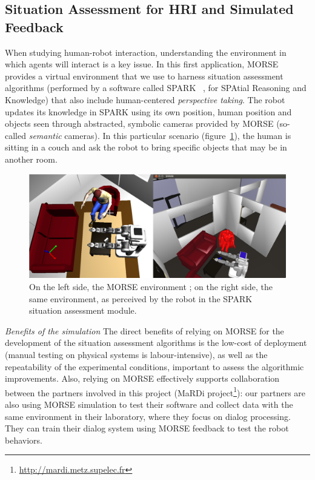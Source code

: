 \documentclass{llncs}
\begin{document}
\subsection{Situation Assessment for HRI and Simulated Feedback}
\label{sc:assessment}

When studying human-robot interaction, understanding the environment in which
agents will interact is a key issue. In this first application, MORSE provides a
virtual environment that we use to harness situation assessment algorithms
(performed by a software called SPARK ~\cite{Warnier2012a}, for SPAtial
Reasoning and Knowledge) that also include human-centered \emph{perspective
taking}. The robot updates its knowledge in SPARK using its own position, human
position and objects seen through abstracted, symbolic cameras provided by MORSE
(so-called \emph{semantic} cameras). In this particular scenario
(figure~\ref{fig|spark}), the human is sitting in a couch and ask the robot to
bring specific objects that may be in another room.

\begin{figure}[t]
      \centering
      \includegraphics[width=0.7\linewidth]{morsespark.png}
      \caption{On the left side, the MORSE environment ; on the right side, the same
      environment, as perceived by the robot in the SPARK situation assessment
      module.}
      \label{fig|spark}
\end{figure}

\emph{Benefits of the simulation} The direct benefits of relying on MORSE for
the development of the situation assessment algorithms is the low-cost of
deployment (manual testing on physical systems is labour-intensive), as well as
the repeatability of the experimental conditions, important to assess the
algorithmic improvements.  Also, relying on MORSE effectively supports
collaboration between the partners involved in this project (MaRDi
project\footnote{\url{http://mardi.metz.supelec.fr}}): our partners are also
using MORSE simulation to test their software and collect data with the same
environment in their laboratory, where they focus on dialog processing. They can
train their dialog system using MORSE feedback to test the robot behaviors.
\end{document}
